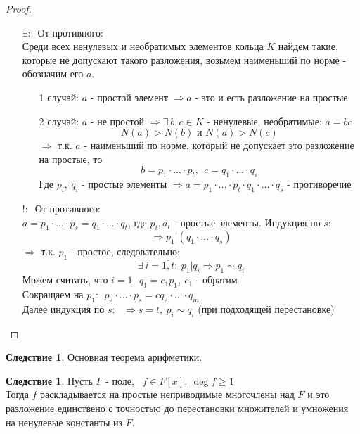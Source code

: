 \documentclass[a4paper, 12pt]{article}
\newcommand\tab[1][.5cm]{\hspace*{#1}}
\newcounter{concount}
\theoremstyle{definition}
\newtheorem{consequensenum}[concount]{Следствие}
\begin{document}
  \begin{proof}\tab
    \begin{itemize}
      \item[ $\exists: \ $ ] От противного:\\
    Среди всех ненулевых и необратимых элементов кольца $K$ найдем такие, которые не допускают такого разложения, возьмем наименьший по норме - обозначим его $a$. 
    \begin{itemize}
      \item[1 случай: ] $a$ - простой элемент $\Longrightarrow a$ - это и есть разложение на простые
      \item[2 случай: ] $a$ - не простой $\Longrightarrow \exists \ b, c \in K$ - ненулевые, необратимые: $a = bc$
      $$N(a)>N(b) \text{ и } N(a)>N(c)$$
      $\Longrightarrow $ т.к. $a$ - наименьший по норме, который не допускает это разложение на простые, то 
      $$b = p_1\cdot ... \cdot p_t, \ \ c = q_1\cdot ... \cdot q_s$$
      Где $p_i, \ q_i$ - простые элементы $\Longrightarrow a = p_1\cdot ... \cdot p_t\cdot q_1\cdot ... \cdot q_s$ - противоречие 
    \end{itemize}
    \item[ $!: \ $ ] От противного:\\
    $a = p_1\cdot ... \cdot p_s = q_1\cdot ... \cdot q_t$, где $p_i, a_i$ - простые элементы. Индукция по $s$:  
    $$\Longrightarrow p_1 | (q_1\cdot ... \cdot q_s)$$
    $\Longrightarrow $  т.к. $p_1$ - простое, следовательно: 
    $$\exists \ i = \overline{1,t}: \ p_1 | q_i \Longrightarrow p_1\sim q_i$$
    Можем считать, что $i =1, \ q_1 = c_1p_1, \ c_1$ - обратим\\
    Сокращаем на $p_1 : \ \ p_2\cdot ... \cdot p_s = cq_2\cdot ...\cdot q_m$\\
    Далее индукция по $s$: \ $\Longrightarrow s=t, \ p_i \sim q_i$ (при подходящей перестановке)  
    \end{itemize}
  \end{proof}
  \setcounter{concount}{0}
  \begin{consequensenum}
    Основная теорема арифметики.
  \end{consequensenum}
  \begin{consequensenum}
    Пусть $F$ - поле, \ $f\in F[x], \ \deg f \geq 1$\\
    Тогда $f$ раскладывается на простые неприводимые многочлены над $F$ и это разложение единствено с точностью до перестановки множителей и умножения на ненулевые константы из $F$.      
  \end{consequensenum}
\end{document}
